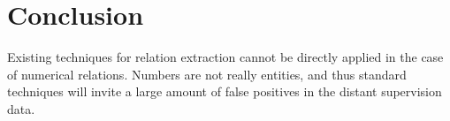 \documentclass[a4paper,10pt]{article}
\begin{document}
\section{Conclusion}
Existing techniques for relation extraction cannot be directly applied in the case of numerical relations.
Numbers are not really entities, and thus standard techniques will invite a large amount of false positives in the 
distant supervision data.

%


\printbibliography[title=References]
\end{document}
